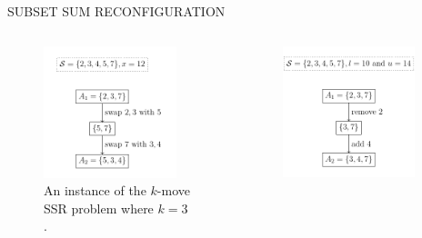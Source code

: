 \begin{frame}{SUBSET SUM RECONFIGURATION}
  \begin{columns}
        \begin{column}{0.5\textwidth}
            \begin{figure}
                \centering
                \includegraphics[width=0.9\textwidth]{img/s_1.png}
                \caption{An instance of the $k$-move SSR problem where $k = 3$.}
                \label{fig:ps}
            \end{figure}
        \end{column}
        \pause
        \begin{column}{0.5\textwidth}
            \begin{figure}
                \centering
                 \includegraphics[width=0.9\textwidth]{img/s_2.png}

\end{figure}
\end{column}
\end{columns}
\end{frame}
